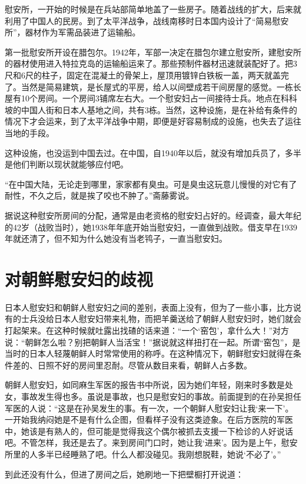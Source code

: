 \documentclass[12pt,UTF8]{ctexbook}
\begin{document}
慰安所，一开始的时候是在兵站部简单地盖了一些房子。随着战线的扩大，后来就利用了中国人的民房。到了太平洋战争，战线南移时日本国内设计了“简易慰安所”，器材作为军需品装进了运输船。

第一批慰安所开设在腊包尔。1942年，军部一决定在腊包尔建立慰安所，建慰安所的器材使用进入特拉克岛的运输船运来了。那些预制件器材迅速就装配好了。把3尺和6尺的柱子，固定在混凝土的骨架上，屋顶用镀锌白铁板一盖，两天就盖完了。当然是简易建筑，是长屋式的平房，给人以间壁成若干间房屋的感觉。一栋长屋有10个房间。一个房间3铺席左右大。一个慰安妇占一间接待士兵。地点在科科坡的中国人街和日本人基地之间，共有3栋。当然，这种设施，是在补给有条件的情况下才会运来，到了太平洋战争中期，即便是好容易制成的设施，也失去了运往当地的手段。

这种设施，也没运到中国去过。在中国，自1940年以后，就没有增加兵员了，多半是他们判断以现状就能够应付吧。

“在中国大陆，无论走到哪里，家家都有臭虫。可是臭虫这玩意儿慢慢的对它有了耐性，不久之后，就是挨了咬也不肿了。”斋藤雾说。

据说这种慰安所房间的分配，通常是由老资格的慰安妇占好的。经调查，最大年纪的42岁（战败当时），她1938年年底开始当慰安妇，一直做到战败。借支早在1939年就还清了，但不知为什么她没有当老鸨子，一直当慰安妇。

\section{对朝鲜慰安妇的歧视}

日本人慰安妇和朝鲜人慰安妇之间的差别，表面上没有，但为了一些小事，比方说有的士兵没给日本人慰安妇带来礼物，而把羊羹送给了朝鲜人慰安妇时，她们就会打起架来。在这种时候就吐露出找碴的话来道：“一个‘窑包’，拿什么大！”对方说：“朝鲜怎么啦？别把朝鲜人当活宝！”据说就这样扭打在一起。所谓“窑包”，是当时的日本人轻蔑朝鲜人时常常使用的称呼。在这种情况下，朝鲜慰安妇就得在条件差的、日照不好的房间里忍耐。尽管从数目来看，朝鲜人占多数。

朝鲜人慰安妇，如同麻生军医的报告书中所说，因为她们年轻，刚来时多数是处女，事故发生得也多。虽说是事故，也只是慰安妇的事故。前面提到的在孙吴担任军医的人说：“这是在孙吴发生的事。有一次，一个朝鲜人慰安妇让我‘来一下’。一开始我纳闷她是不是有什么企图，但看样子没有这类迹象。在后方医院的军医中，她该是有熟人的，但可能是觉得我这个偶尔被抓去支援一下检诊的人好说话吧。不管怎样，我还是去了。来到房间门口时，她让我‘进来’。因为是上午，慰安所里的人多半已经睡熟了吧。什么人都没碰见。我刚想脱鞋，她说‘不必了’。”

到此还没有什么，但进了房间之后，她刷地一下把壁橱打开说道：
\end{document}
